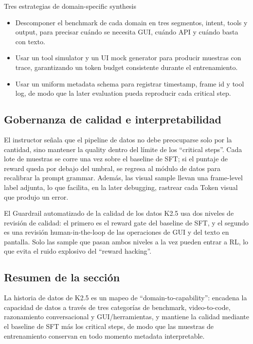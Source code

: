 \documentclass[a4paper]{article}
\begin{document}
\begin{knowledgebox}{Tres estrategias de domain-specific synthesis}
\begin{itemize}
    \item Descomponer el benchmark de cada domain en tres segmentos, intent, tools y output, para precisar cuándo se necesita GUI, cuándo API y cuándo basta con texto.
    \item Usar un tool simulator y un UI mock generator para producir muestras con trace, garantizando un token budget consistente durante el entrenamiento.
    \item Usar un uniform metadata schema para registrar timestamp, frame id y tool log, de modo que la later evaluation pueda reproducir cada critical step.
\end{itemize}
\end{knowledgebox}

\subsection{Gobernanza de calidad e interpretabilidad}
El instructor señala que el pipeline de datos no debe preocuparse solo por la cantidad, sino mantener la quality dentro del límite de los ``critical steps''. Cada lote de muestras se corre una vez sobre el baseline de SFT; si el puntaje de reward queda por debajo del umbral, se regresa al módulo de datos para recalibrar la prompt grammar. Además, las visual sample llevan una frame-level label adjunta, lo que facilita, en la later debugging, rastrear cada Token visual que produjo un error.

\begin{importantbox}{El Guardrail automatizado de la calidad de los datos}
K2.5 usa dos niveles de revisión de calidad: el primero es el reward gate del baseline de SFT, y el segundo es una revisión human-in-the-loop de las operaciones de GUI y del texto en pantalla. Solo las sample que pasan ambos niveles a la vez pueden entrar a RL, lo que evita el ruido explosivo del ``reward hacking''.
\end{importantbox}

\subsection{Resumen de la sección}
La historia de datos de K2.5 es un mapeo de ``domain-to-capability'': encadena la capacidad de datos a través de tres categorías de benchmark, video-to-code, razonamiento conversacional y GUI/herramientas, y mantiene la calidad mediante el baseline de SFT más los critical steps, de modo que las muestras de entrenamiento conservan en todo momento metadata interpretable.
\end{document}
